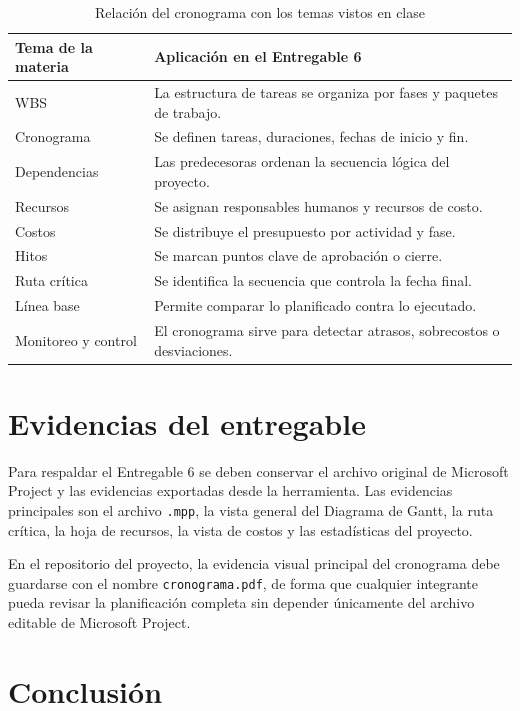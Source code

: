 \documentclass[11pt,spanish]{article}
\begin{document}
\begin{table}[H]
\centering
\caption{Relación del cronograma con los temas vistos en clase}
\begin{tabularx}{\textwidth}{p{4.2cm} Y}
\toprule
\textbf{Tema de la materia} & \textbf{Aplicación en el Entregable 6} \\
\midrule
WBS & La estructura de tareas se organiza por fases y paquetes de trabajo. \\
Cronograma & Se definen tareas, duraciones, fechas de inicio y fin. \\
Dependencias & Las predecesoras ordenan la secuencia lógica del proyecto. \\
Recursos & Se asignan responsables humanos y recursos de costo. \\
Costos & Se distribuye el presupuesto por actividad y fase. \\
Hitos & Se marcan puntos clave de aprobación o cierre. \\
Ruta crítica & Se identifica la secuencia que controla la fecha final. \\
Línea base & Permite comparar lo planificado contra lo ejecutado. \\
Monitoreo y control & El cronograma sirve para detectar atrasos, sobrecostos o desviaciones. \\
\bottomrule
\end{tabularx}
\end{table}

\section{Evidencias del entregable}

Para respaldar el Entregable 6 se deben conservar el archivo original de Microsoft Project y las evidencias exportadas desde la herramienta. Las evidencias principales son el archivo \texttt{.mpp}, la vista general del Diagrama de Gantt, la ruta crítica, la hoja de recursos, la vista de costos y las estadísticas del proyecto.

En el repositorio del proyecto, la evidencia visual principal del cronograma debe guardarse con el nombre \texttt{cronograma.pdf}, de forma que cualquier integrante pueda revisar la planificación completa sin depender únicamente del archivo editable de Microsoft Project.

\section{Conclusión}
\end{document}

